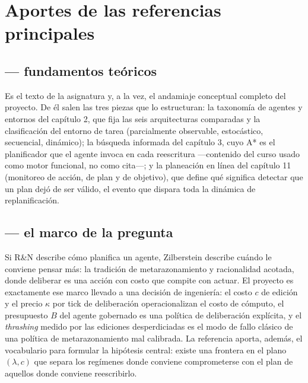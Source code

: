 \section{Aportes de las referencias principales}

\subsection*{\textcite{russellNorvig2020} — fundamentos teóricos}

Es el texto de la asignatura y, a la vez, el andamiaje conceptual completo del
proyecto. De él salen las tres piezas que lo estructuran: la taxonomía de agentes y
entornos del capítulo 2, que fija las seis arquitecturas comparadas y la clasificación
del entorno de tarea (parcialmente observable, estocástico, secuencial, dinámico); la
búsqueda informada del capítulo 3, cuyo A* es el planificador que el agente invoca en
cada reescritura —contenido del curso usado como motor funcional, no como cita—; y la
planeación en línea del capítulo 11 (monitoreo de acción, de plan y de objetivo), que
define qué significa detectar que un plan dejó de ser válido, el evento que dispara
toda la dinámica de replanificación.

\subsection*{\textcite{zilberstein2011metareasoning} — el marco de la pregunta}

Si R\&N describe cómo planifica un agente, Zilberstein describe cuándo le conviene
pensar más: la tradición de metarazonamiento y racionalidad acotada, donde deliberar
es una acción con costo que compite con actuar. El proyecto es exactamente ese marco
llevado a una decisión de ingeniería: el costo $c$ de edición y el precio $\kappa$ por
tick de deliberación operacionalizan el costo de cómputo, el presupuesto $B$ del agente
gobernado es una política de deliberación explícita, y el \emph{thrashing} medido por
las ediciones desperdiciadas es el modo de fallo clásico de una política de
metarazonamiento mal calibrada. La referencia aporta, además, el vocabulario para
formular la hipótesis central: existe una frontera en el plano $(\lambda, c)$ que
separa los regímenes donde conviene comprometerse con el plan de aquellos donde
conviene reescribirlo.
